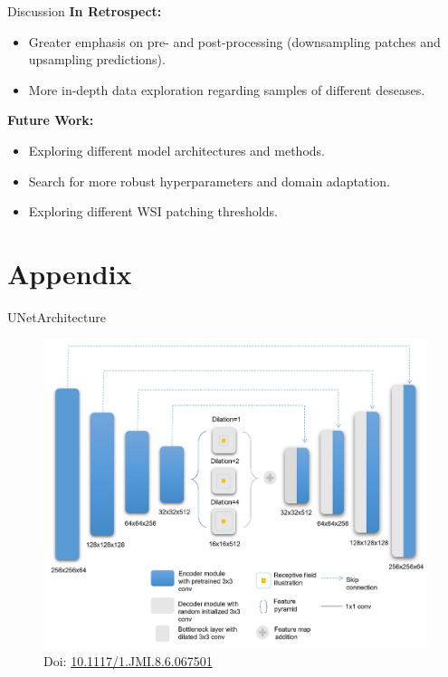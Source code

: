 \documentclass{beamer}
\begin{document}
\begin{frame}{Discussion}
    \textbf{In Retrospect:}
    \begin{itemize}
        \item Greater emphasis on pre- and post-processing (downsampling patches and upsampling predictions).
        \item More in-depth data exploration regarding samples of different deseases.
    \end{itemize}

    \vspace{0.5cm}

    \textbf{Future Work:}
    \begin{itemize}
        \item Exploring different model architectures and methods.
        \item Search for more robust hyperparameters and domain adaptation.
        \item Exploring different WSI patching thresholds.
    \end{itemize}
\end{frame}

\appendix

\section{Appendix}

\begin{frame}{UNetArchitecture}
    \begin{figure}
        \centering
        \includegraphics[height=0.7\textheight]{Images/UNetArchitecture.png}
        \caption{Doi: \href{https://doi.org/10.1117/1.JMI.8.6.067501}{10.1117/1.JMI.8.6.067501}}
    \end{figure}
\end{frame}
\end{document}

